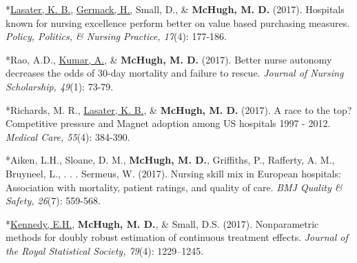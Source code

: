 \documentclass[10pt,]{article}
\begin{document}
{{{{{{{{{{{{{{{\begin{hangparas}{.25in}{1}
\end{hangparas}



\begin{hangparas}{.25in}{1}

*{\underline {Lasater, K. B.}}, {\underline {Germack, H.,}} Small, D., \& {\textbf {McHugh, M. D.}} (2017). Hospitals known for nursing excellence perform better on value based purchasing measures. {\textit {Policy, Politics, \& Nursing Practice, 17}}(4): 177-186.

\end{hangparas}



\begin{hangparas}{.25in}{1}

*Rao, A.D., {\underline {Kumar, A.}}, \& {\textbf {McHugh, M. D.}} (2017). Better nurse autonomy decreases the odds of 30-day mortality and failure to rescue. {\textit {Journal of Nursing Scholarship, 49}}(1): 73-79.

\end{hangparas}



\begin{hangparas}{.25in}{1}

*Richards, M. R., {\underline {Lasater, K. B.}}, \& {\textbf {McHugh, M. D.}} (2017). A race to the top? Competitive pressure and Magnet adoption among US hospitals 1997 - 2012. {\textit {Medical Care, 55}}(4): 384-390.

\end{hangparas}



\begin{hangparas}{.25in}{1}

*Aiken, L.H., Sloane, D. M., {\textbf {McHugh, M. D.}}, Griffiths, P., Rafferty, A. M., Bruyneel, L., . . . Sermeus, W. (2017). Nursing skill mix in European hospitals: Association with mortality, patient ratings, and quality of care. {\textit {BMJ Quality \& Safety, 26}}(7): 559-568.

\end{hangparas}



\begin{hangparas}{.25in}{1}

*{\underline {Kennedy, E.H.}}, {\textbf {McHugh, M. D.}}, \& Small, D.S. (2017). Nonparametric methods for doubly robust estimation of continuous treatment effects. {\textit {Journal of the Royal Statistical Society, 79}}(4): 1229–1245.


\end{hangparas}}}}}}}}}}}}}}}}
\end{document}
